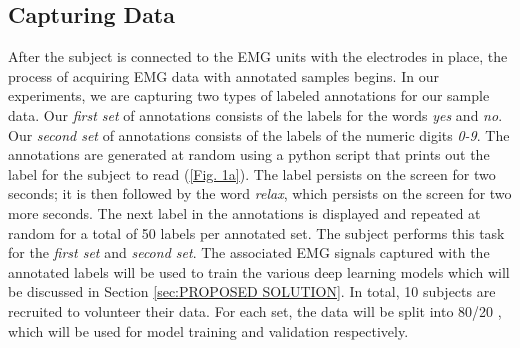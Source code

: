 \documentclass{article}
\begin{document}
\subsection{Capturing Data}
\label{ssec:Capturing Data}
After the subject is connected to the EMG units with the electrodes in place, the process of acquiring EMG data with annotated samples begins. In our experiments, we are capturing two types of labeled annotations for our sample data. Our \textit{first set} of annotations consists of the labels for the words \textit{yes} and \textit{no}. Our \textit{second set} of annotations consists of the labels of the numeric digits \textit{0-9}. The annotations are generated at random using a python script that prints out the label for the subject to read  (\figurename \ref{Fig. 1a}). The label persists on the screen for two seconds; it is then followed by the word \textit{relax}, which persists on the screen for two more seconds. The next label in the annotations is displayed and repeated at random for a total of 50 labels per annotated set. The subject performs this task for the \textit{first set} and \textit{second set}. The associated EMG signals captured with the annotated labels will be used to train the various deep learning models which will be discussed in Section \ref{sec:PROPOSED SOLUTION}. In total, 10 subjects are recruited to volunteer their data. For each set, the data will be split into 80/20 , which will be used for model training and validation respectively. 
\end{document}
